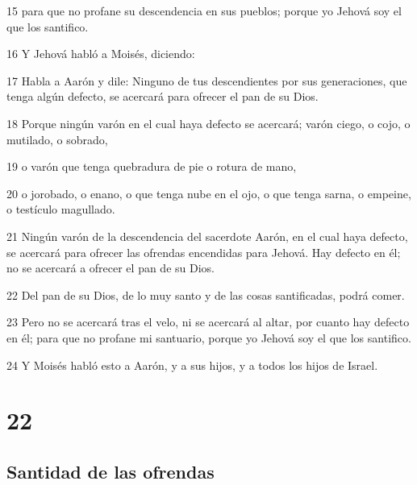 \par 15 para que no profane su descendencia en sus pueblos; porque yo Jehová soy el que los santifico.
\par 16 Y Jehová habló a Moisés, diciendo:
\par 17 Habla a Aarón y dile: Ninguno de tus descendientes por sus generaciones, que tenga algún defecto, se acercará para ofrecer el pan de su Dios.
\par 18 Porque ningún varón en el cual haya defecto se acercará; varón ciego, o cojo, o mutilado, o sobrado,
\par 19 o varón que tenga quebradura de pie o rotura de mano,
\par 20 o jorobado, o enano, o que tenga nube en el ojo, o que tenga sarna, o empeine, o testículo magullado.
\par 21 Ningún varón de la descendencia del sacerdote Aarón, en el cual haya defecto, se acercará para ofrecer las ofrendas encendidas para Jehová. Hay defecto en él; no se acercará a ofrecer el pan de su Dios.
\par 22 Del pan de su Dios, de lo muy santo y de las cosas santificadas, podrá comer.
\par 23 Pero no se acercará tras el velo, ni se acercará al altar, por cuanto hay defecto en él; para que no profane mi santuario, porque yo Jehová soy el que los santifico.
\par 24 Y Moisés habló esto a Aarón, y a sus hijos, y a todos los hijos de Israel.

\chapter{22}

\section*{Santidad de las ofrendas}

